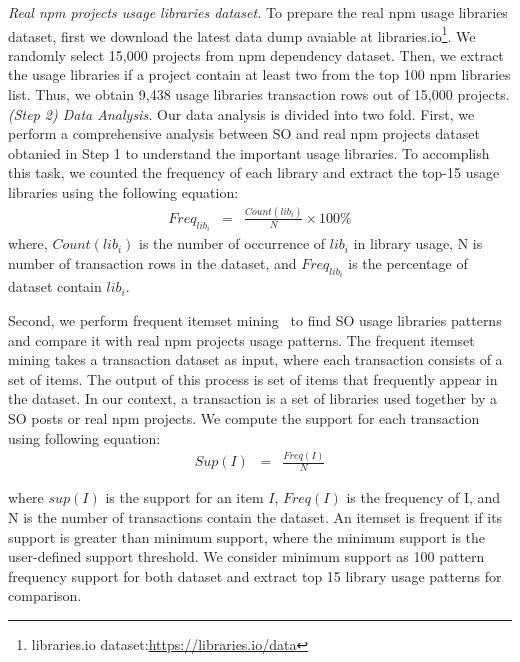 \documentclass[paper]{ieice}
\begin{document}
\textit{Real npm projects usage libraries dataset.}
To prepare the real npm usage libraries dataset, first we download the latest data dump avaiable at libraries.io\footnote{libraries.io dataset:\url{https://libraries.io/data}}. 
We randomly select 15,000 projects from npm dependency dataset. 
Then, we extract the usage libraries if a project contain at least two from the top 100 npm libraries list. 
Thus, we obtain 9,438 usage libraries transaction rows out of 15,000 projects.
\\

\noindent\textit{(Step 2) Data Analysis. }Our data analysis is divided into two fold. First, we perform a comprehensive analysis between SO and real npm projects dataset obtanied in Step 1 to understand the important usage libraries. To accomplish this task, we counted the frequency of each library and extract the top-15 usage libraries using the following equation:
\begin{eqnarray}
    Freq_{lib_i} & = & {\frac{Count (lib_i)}{N}}\times 100\%
\end{eqnarray}
where, $Count (lib_i)$ is the number of occurrence of $lib_i$ in library usage, N is number of transaction rows in the dataset, and $Freq_{lib_i}$ is the percentage of dataset contain $lib_i$.

Second, we perform frequent itemset mining~\cite{thung2013automated} to find SO usage libraries patterns and compare it with real npm projects usage patterns. 
The frequent itemset mining takes a transaction dataset as input, where each transaction consists of a set of items. 
The output of this process is set of items that frequently appear in the dataset. 
In our context, a transaction is a set of libraries used together by a SO posts or real npm projects. 
We compute the support for each transaction using following equation:
\begin{eqnarray}
    Sup(I) & = & {\frac{Freq (I)}{N}}
\end{eqnarray}

where $sup(I)$ is the support for an item $I$, $Freq(I)$ is the frequency of I, and N is the number of transactions contain the dataset. An itemset is frequent if its support is greater than minimum support, where the minimum support is the user-defined support threshold.
We consider minimum support as 100 pattern frequency support for both dataset and extract top 15 library usage patterns for comparison. 
\\
\end{document}
